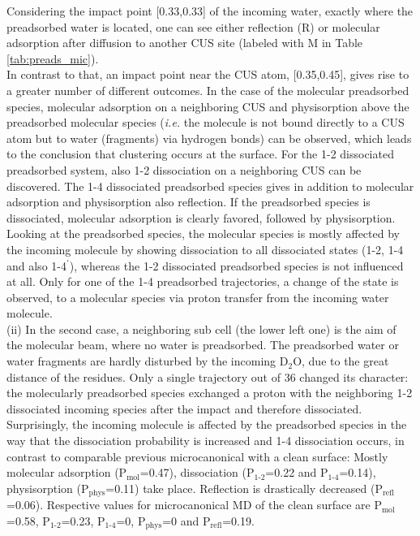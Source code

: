 \documentclass[11pt,DIV=13,BCOR=5mm,a4paper,headinclude]{scrbook}
\begin{document}
Considering the impact point [0.33,0.33] of the incoming water, exactly where the preadsorbed water is located, one can see either reflection (R) or molecular adsorption after diffusion to another CUS site (labeled with M in Table \ref{tab:preads_mic}).\\
In contrast to that, an impact point near the CUS atom, [0.35,0.45], gives rise to a greater number of different outcomes.
In the case of the molecular preadsorbed species, molecular adsorption on a neighboring CUS and physisorption above the preadsorbed molecular species (\textit{i.e.} the molecule is not bound directly to a CUS atom but  to water (fragments) via hydrogen bonds) can be observed, which leads to the conclusion that clustering occurs at the surface.
For the 1-2 dissociated preadsorbed system, also 1-2 dissociation on a neighboring CUS can be discovered.
The 1-4 dissociated preadsorbed species gives in addition to molecular adsorption and physisorption also reflection.
If the preadsorbed species is dissociated, molecular adsorption is clearly favored, followed by physisorption.
\\
Looking at the preadsorbed species, the molecular species is mostly affected by the incoming molecule by showing dissociation to all dissociated states (1-2, 1-4 and also 1-4$^\prime$), whereas the 1-2 dissociated preadsorbed species is not influenced at all.
Only for one of the 1-4 preadsorbed trajectories, a change of the state is observed, to a molecular species via proton transfer from the incoming water molecule.
\\
(ii) In the second case, a neighboring sub cell (the lower left one) is the aim of the molecular beam, where no water is preadsorbed.
The preadsorbed water or water fragments are hardly disturbed by the incoming D$_2$O, due to the great distance of the residues.
Only a single trajectory out of 36 changed its character: the molecularly preadsorbed species exchanged a proton with the neighboring 1-2 dissociated incoming species after the impact and therefore dissociated.
\\
Surprisingly, the incoming molecule is affected by the preadsorbed species in the way that the dissociation probability is increased and 1-4 dissociation occurs, in contrast to comparable previous microcanonical with a clean surface: Mostly molecular adsorption (P$_\textrm{mol}$=0.47), dissociation (P$_\textrm{1-2}$=0.22 and P$_\textrm{1-4}$=0.14), physisorption (P$_\textrm{phys}$=0.11) take place.
Reflection is drastically decreased (P$_\textrm{refl}$=0.06).
Respective values for microcanonical MD of the clean surface are P$_\textrm{mol}$=0.58, P$_\textrm{1-2}$=0.23, P$_\textrm{1-4}$=0, P$_\textrm{phys}$=0 and P$_\textrm{refl}$=0.19.
\end{document}
